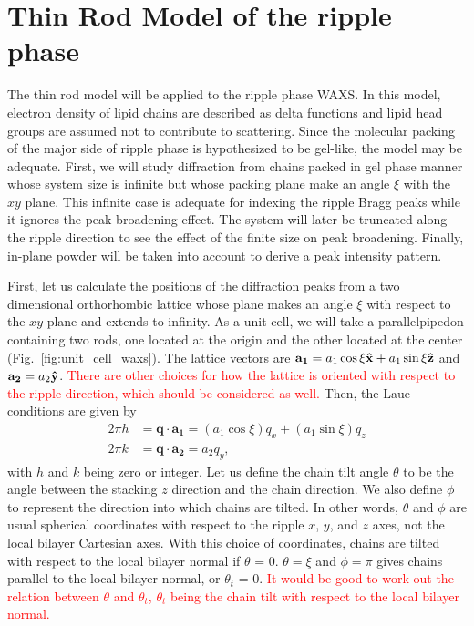 \documentclass[12pt]{article}
\date{\today}
\begin{document}
\section{Thin Rod Model of the ripple phase}
The thin rod model will be applied to the ripple phase WAXS. 
In this model, electron density of lipid chains are described as delta 
functions and lipid head groups are assumed not to contribute to scattering. 
Since the molecular packing of the major side of ripple phase is hypothesized 
to be gel-like, the model may be adequate. First, we will study diffraction 
from chains packed in gel phase manner whose system size is infinite but whose 
packing plane make an angle $\xi$ with the $xy$ plane. 
This infinite case is adequate for indexing the ripple Bragg peaks while
it ignores the peak broadening effect.
The system will later be truncated along the ripple direction to see the effect 
of the finite size on peak broadening. Finally, in-plane powder will be taken 
into account to derive a peak intensity pattern.

First, let us calculate the positions of the diffraction peaks from a two 
dimensional orthorhombic lattice whose plane makes an angle $\xi$ with 
respect to the $xy$ plane and extends to infinity. 
As a unit cell, we will take a parallelpipedon containing two rods,
one located at the origin and the other located at the center
(Fig.~\ref{fig:unit_cell_waxs}).
The lattice vectors are $\mathbf{a_1}=a_1\cos\xi\mathbf{\hat{x}}+a_1\sin\xi\mathbf{\hat{z}}$ 
and $\mathbf{a_2}=a_2\mathbf{\hat{y}}$. \textcolor{red}{There are other choices for
how the lattice is oriented with respect to the ripple direction,
which should be considered as well.}
Then, the Laue conditions are given by
\begin{align}
	2\pi h &=\mathbf{q}\cdot\mathbf{a_1}=(a_1\cos\xi)q_x+(a_1\sin\xi)q_z \\
	2\pi k &=\mathbf{q}\cdot\mathbf{a_2}=a_2 q_y,
\end{align}
with $h$ and $k$ being zero or integer. 
Let us define the chain tilt angle $\theta$ to be the angle between
the stacking $z$ direction and the chain direction. We also define
$\phi$ to represent the direction into which chains are tilted.
In other words, $\theta$ and $\phi$ are usual spherical coordinates
with respect to the ripple $x$, $y$, and $z$ axes, not the local
bilayer Cartesian axes. With this choice of coordinates, chains 
are tilted with respect to the local bilayer normal if 
$\theta$ = 0. $\theta=\xi$ and $\phi=\pi$ gives chains parallel to the
local bilayer normal, or $\theta_t$ = 0. 
\textcolor{red}{It would be good to work out
the relation between $\theta$ and $\theta_t$, $\theta_t$ being the chain tilt
with respect to the local bilayer normal.}
\end{document}
